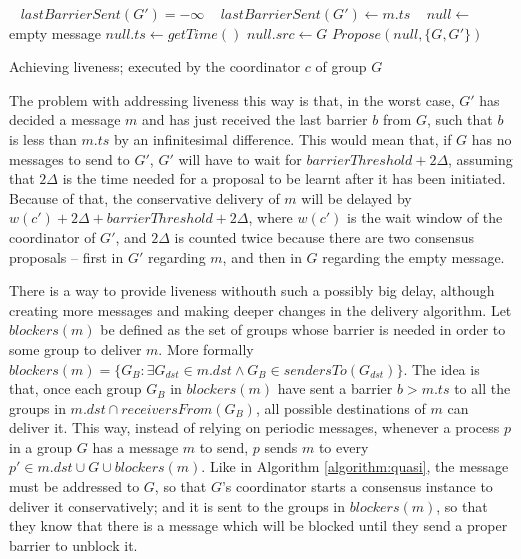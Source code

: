 \documentclass[times, 10pt]{article}
\begin{document}
\begin{algorithm}
\begin{distribalgo}[1]
\blankline\
    \STATE $lastBarrierSent(G') = -\infty$
  \ENDINDENT
\ENDINDENT
\blankline\
    \STATE $lastBarrierSent(G') \leftarrow m.ts$
  \ENDINDENT
\ENDINDENT
\blankline\
  \STATE $null \leftarrow$ empty message
  \STATE $null.ts \leftarrow getTime()$
  \STATE $null.src \leftarrow G$
  \STATE $Propose(null, \{G,G'\})$
\ENDINDENT
\blankline\

\caption{Achieving liveness; executed by the coordinator $c$ of group $G$}
\label{algorithm:liveness}
\end{distribalgo}
\end{algorithm}

The problem with addressing liveness this way is that, in the worst case, $G'$ has decided a message $m$ and has just received the last barrier $b$ from $G$, such that $b$ is less than $m.ts$ by an infinitesimal difference. This would mean that, if $G$ has no messages to send to $G'$, $G'$ will have to wait for $barrierThreshold + 2\Delta$, assuming that $2\Delta$ is the time needed for a proposal to be learnt after it has been initiated. Because of that, the conservative delivery of $m$ will be delayed by $w(c') + 2\Delta + barrierThreshold + 2\Delta$, where $w(c')$ is the wait window of the coordinator of $G'$, and $2\Delta$ is counted twice because there are two consensus proposals -- first in $G'$ regarding $m$, and then in $G$ regarding the empty message.

There is a way to provide liveness withouth such a possibly big delay, although creating more messages and making deeper changes in the delivery algorithm. Let $blockers(m)$ be defined as the set of groups whose barrier is needed in order to some group to deliver $m$. More formally $blockers(m) = \{G_B : \exists G_{dst} \in m.dst \wedge G_B \in sendersTo(G_{dst})\}$. The idea is that, once each group $G_B$ in $blockers(m)$ have sent a barrier $b > m.ts$ to all the groups in $m.dst \cap receiversFrom(G_B)$, all possible destinations of $m$ can deliver it. This way, instead of relying on periodic messages, whenever a process $p$ in a group $G$ has a message $m$ to send, $p$ sends $m$ to every $p' \in m.dst \cup G \cup blockers(m)$. Like in Algorithm \ref{algorithm:quasi}, the message must be addressed to $G$, so that $G$'s coordinator starts a consensus instance to deliver it conservatively; and it is sent to the groups in $blockers(m)$, so that they know that there is a message which will be blocked until they send a proper barrier to unblock it.
\end{document}
